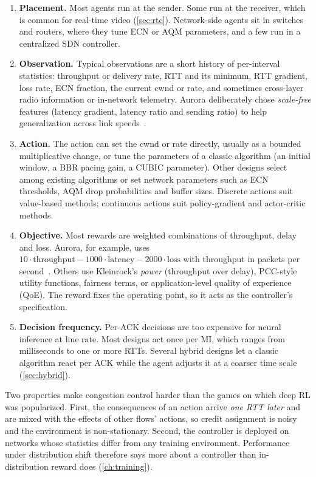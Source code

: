 \begin{enumerate}
  \item \textbf{Placement.} Most agents run at the sender. Some run at the receiver, which is common for real-time video (\cref{sec:rtc}). Network-side agents sit in switches and routers, where they tune ECN or AQM parameters, and a few run in a centralized SDN controller.
  \item \textbf{Observation.} Typical observations are a short history of per-interval statistics: throughput or delivery rate, RTT and its minimum, RTT gradient, loss rate, ECN fraction, the current cwnd or rate, and sometimes cross-layer radio information or in-network telemetry. Aurora deliberately chose \emph{scale-free} features (latency gradient, latency ratio and sending ratio) to help generalization across link speeds~\cite{jay2019aurora}.
  \item \textbf{Action.} The action can set the cwnd or rate directly, usually as a bounded multiplicative change, or tune the parameters of a classic algorithm (an initial window, a BBR pacing gain, a CUBIC parameter). Other designs select among existing algorithms or set network parameters such as ECN thresholds, AQM drop probabilities and buffer sizes. Discrete actions suit value-based methods; continuous actions suit policy-gradient and actor-critic methods.
  \item \textbf{Objective.} Most rewards are weighted combinations of throughput, delay and loss. Aurora, for example, uses $10\cdot\text{throughput} - 1000\cdot\text{latency} - 2000\cdot\text{loss}$ with throughput in packets per second~\cite{jay2019aurora}. Others use Kleinrock's \emph{power} (throughput over delay), PCC-style utility functions, fairness terms, or application-level quality of experience (QoE). The reward fixes the operating point, so it acts as the controller's specification.
  \item \textbf{Decision frequency.} Per-ACK decisions are too expensive for neural inference at line rate. Most designs act once per MI, which ranges from milliseconds to one or more RTTs. Several hybrid designs let a classic algorithm react per ACK while the agent adjusts it at a coarser time scale (\cref{sec:hybrid}).
\end{enumerate}

\noindent Two properties make congestion control harder than the games on which deep RL was popularized. First, the consequences of an action arrive \emph{one RTT later} and are mixed with the effects of other flows' actions, so credit assignment is noisy and the environment is non-stationary. Second, the controller is deployed on networks whose statistics differ from any training environment. Performance under distribution shift therefore says more about a controller than in-distribution reward does (\cref{ch:training}).

